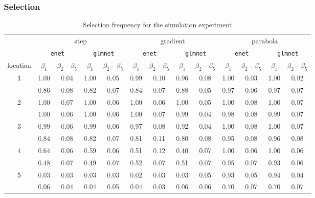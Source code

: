 \documentclass[authoryear, review, 11pt]{elsarticle}
\begin{document}
		\subsubsection{Selection}
		\begin{table}
		\thispagestyle{empty}
		\begin{center}
		\setlength\tabcolsep{4pt}	
\begin{tabular}{ccc|cc|cc|cc|cc|cc}
& \multicolumn{4}{c}{step} & \multicolumn{4}{|c|}{gradient} & \multicolumn{4}{c}{parabola} \\
& \multicolumn{2}{c}{{\tt enet}} & \multicolumn{2}{c|}{{\tt glmnet}} & \multicolumn{2}{c}{{\tt enet}} & \multicolumn{2}{c|}{{\tt glmnet}} & \multicolumn{2}{c}{{\tt enet}} & \multicolumn{2}{c}{{\tt glmnet}}\\
 location & $\beta_1$ & $\beta_2$ - $\beta_5$ & $\beta_1$ & $\beta_2$ - $\beta_5$ & $\beta_1$ & $\beta_2$ - $\beta_5$ & $\beta_1$ & $\beta_2$ - $\beta_5$ & $\beta_1$ & $\beta_2$ - $\beta_5$ & $\beta_1$ & $\beta_2$ - $\beta_5$ \\ 
  \hline
   \multirow{2}{*}{1} & 1.00 & 0.04 & 1.00 & 0.05 & 0.99 & 0.10 & 0.96 & 0.08 & 1.00 & 0.03 & 1.00 & 0.02 \\ 
   & 0.86 & 0.08 & 0.82 & 0.07 & 0.84 & 0.07 & 0.88 & 0.05 & 0.97 & 0.06 & 0.97 & 0.07 \\ 
      \cline{2-13}
   \multirow{2}{*}{2} & 1.00 & 0.07 & 1.00 & 0.06 & 1.00 & 0.06 & 1.00 & 0.05 & 1.00 & 0.08 & 1.00 & 0.07 \\ 
   & 1.00 & 0.06 & 1.00 & 0.06 & 1.00 & 0.07 & 0.99 & 0.04 & 0.98 & 0.08 & 0.99 & 0.07 \\ 
      \cline{2-13}
   \multirow{2}{*}{3} & 0.99 & 0.06 & 0.99 & 0.06 & 0.97 & 0.08 & 0.92 & 0.04 & 1.00 & 0.08 & 1.00 & 0.07 \\ 
   & 0.84 & 0.08 & 0.82 & 0.07 & 0.81 & 0.11 & 0.80 & 0.08 & 0.95 & 0.08 & 0.96 & 0.08 \\ 
      \cline{2-13}
   \multirow{2}{*}{4} & 0.64 & 0.06 & 0.59 & 0.06 & 0.51 & 0.12 & 0.40 & 0.07 & 1.00 & 0.06 & 1.00 & 0.06 \\ 
   & 0.48 & 0.07 & 0.49 & 0.07 & 0.52 & 0.07 & 0.51 & 0.07 & 0.95 & 0.07 & 0.93 & 0.06 \\ 
      \cline{2-13}
   \multirow{2}{*}{5} & 0.03 & 0.03 & 0.03 & 0.03 & 0.02 & 0.03 & 0.03 & 0.05 & 0.93 & 0.05 & 0.94 & 0.04 \\ 
   & 0.06 & 0.04 & 0.04 & 0.05 & 0.04 & 0.03 & 0.06 & 0.06 & 0.70 & 0.07 & 0.70 & 0.07 \\ 
  \end{tabular}
		\caption{Selection frequency for the simulation experiment\label{table:selection}}
		\end{center}
		\end{table}
		
\end{document}

